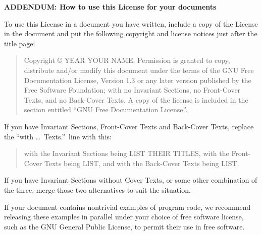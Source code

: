 \documentclass{article}
\begin{document}
	
	\begin{center}
		{\Large\bf ADDENDUM: How to use this License for your documents\par}
	\end{center}
	
	To use this License in a document you have written, include a copy of
	the License in the document and put the following copyright and
	license notices just after the title page:
	
	\bigskip
	\begin{quote}
		Copyright \copyright{}  YEAR  YOUR NAME.
		Permission is granted to copy, distribute and/or modify this document
		under the terms of the GNU Free Documentation License, Version 1.3
		or any later version published by the Free Software Foundation;
		with no Invariant Sections, no Front-Cover Texts, and no Back-Cover Texts.
		A copy of the license is included in the section entitled ``GNU
		Free Documentation License''.
	\end{quote}
	\bigskip
	
	If you have Invariant Sections, Front-Cover Texts and Back-Cover Texts,
	replace the ``with \dots\ Texts.''\ line with this:
	
	\bigskip
	\begin{quote}
		with the Invariant Sections being LIST THEIR TITLES, with the
		Front-Cover Texts being LIST, and with the Back-Cover Texts being LIST.
	\end{quote}
	\bigskip
	
	If you have Invariant Sections without Cover Texts, or some other
	combination of the three, merge those two alternatives to suit the
	situation.
	
	If your document contains nontrivial examples of program code, we
	recommend releasing these examples in parallel under your choice of
	free software license, such as the GNU General Public License,
	to permit their use in free software.
\end{document}
